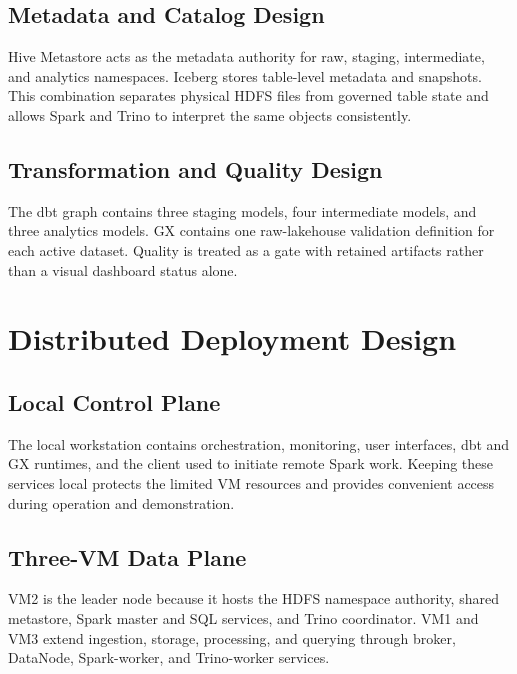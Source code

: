 \subsection{Metadata and Catalog Design}
Hive Metastore acts as the metadata authority for raw, staging, intermediate, and analytics namespaces. Iceberg stores table-level metadata and snapshots. This combination separates physical HDFS files from governed table state and allows Spark and Trino to interpret the same objects consistently.

\subsection{Transformation and Quality Design}
The dbt graph contains three staging models, four intermediate models, and three analytics models. GX contains one raw-lakehouse validation definition for each active dataset. Quality is treated as a gate with retained artifacts rather than a visual dashboard status alone.

\section{Distributed Deployment Design}

\subsection{Local Control Plane}
The local workstation contains orchestration, monitoring, user interfaces, dbt and GX runtimes, and the client used to initiate remote Spark work. Keeping these services local protects the limited VM resources and provides convenient access during operation and demonstration.

\subsection{Three-VM Data Plane}
VM2 is the leader node because it hosts the HDFS namespace authority, shared metastore, Spark master and SQL services, and Trino coordinator. VM1 and VM3 extend ingestion, storage, processing, and querying through broker, DataNode, Spark-worker, and Trino-worker services.

